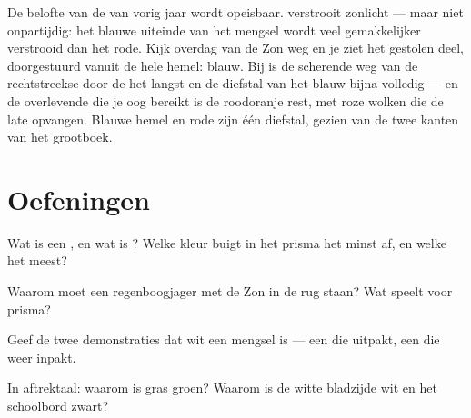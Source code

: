 \begin{remark}\label{rem:g8:colors-spectra:sunset}
De belofte van de  van vorig jaar wordt opeisbaar.
 verstrooit zonlicht --- maar niet onpartijdig: het blauwe
uiteinde van het mengsel wordt veel gemakkelijker verstrooid dan het
rode. Kijk overdag van de Zon weg en je ziet het gestolen deel,
doorgestuurd vanuit de hele hemel: blauw. Bij
 is de scherende weg van de rechtstreekse
 door de  het langst en de diefstal van het
blauw bijna volledig --- en de overlevende die je oog bereikt is de
roodoranje rest, met roze wolken die de late  opvangen.
Blauwe hemel en rode  zijn één diefstal, gezien van
de twee kanten van het grootboek.
\end{remark}

\section{Oefeningen}

\begin{exercise}[$\star$]\label{exo:g8:colors-spectra:1}
Wat is een , en wat is ? Welke kleur
buigt in het prisma het minst af, en welke het meest?
\end{exercise}

\begin{exercise}[$\star$]\label{exo:g8:colors-spectra:2}
Waarom moet een regenboogjager met de Zon in de rug staan? Wat speelt
voor prisma?
\end{exercise}

\begin{exercise}[$\star$]\label{exo:g8:colors-spectra:3}
Geef de twee demonstraties dat wit  een mengsel is --- een
die uitpakt, een die weer inpakt.
\end{exercise}

\begin{exercise}[$\star$]\label{exo:g8:colors-spectra:4}
In aftrektaal: waarom is gras groen? Waarom is de witte bladzijde wit
en het schoolbord zwart?
\end{exercise}

